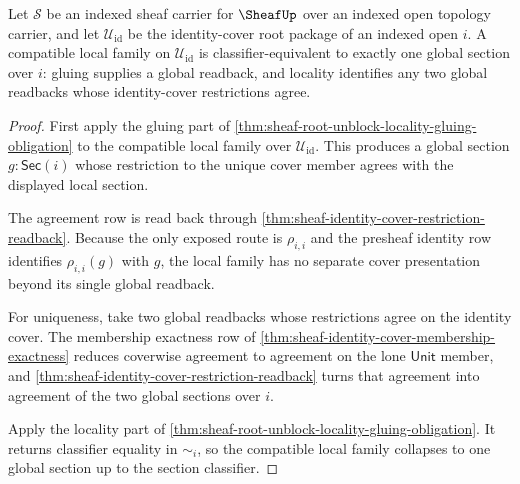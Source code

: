 \begin{theorem}
\label{thm:sheaf-identity-cover-gluing-collapse}
Let $\mathcal{S}$ be an indexed sheaf carrier for $\SheafUp$ over an indexed open topology carrier, and let $\mathcal{U}_{\mathrm{id}}$ be the identity-cover root package of an indexed open $i$. A compatible local family on $\mathcal{U}_{\mathrm{id}}$ is classifier-equivalent to exactly one global section over $i$: gluing supplies a global readback, and locality identifies any two global readbacks whose identity-cover restrictions agree.
\end{theorem}
\begin{proof}
First apply the gluing part of \autoref{thm:sheaf-root-unblock-locality-gluing-obligation} to the compatible local family over $\mathcal{U}_{\mathrm{id}}$. This produces a global section $g:\mathsf{Sec}(i)$ whose restriction to the unique cover member agrees with the displayed local section.

The agreement row is read back through \autoref{thm:sheaf-identity-cover-restriction-readback}. Because the only exposed route is $\rho_{i,i}$ and the presheaf identity row identifies $\rho_{i,i}(g)$ with $g$, the local family has no separate cover presentation beyond its single global readback.

For uniqueness, take two global readbacks whose restrictions agree on the identity cover. The membership exactness row of \autoref{thm:sheaf-identity-cover-membership-exactness} reduces coverwise agreement to agreement on the lone $\mathsf{Unit}$ member, and \autoref{thm:sheaf-identity-cover-restriction-readback} turns that agreement into agreement of the two global sections over $i$.

Apply the locality part of \autoref{thm:sheaf-root-unblock-locality-gluing-obligation}. It returns classifier equality in $\sim_i$, so the compatible local family collapses to one global section up to the section classifier.
\end{proof}
